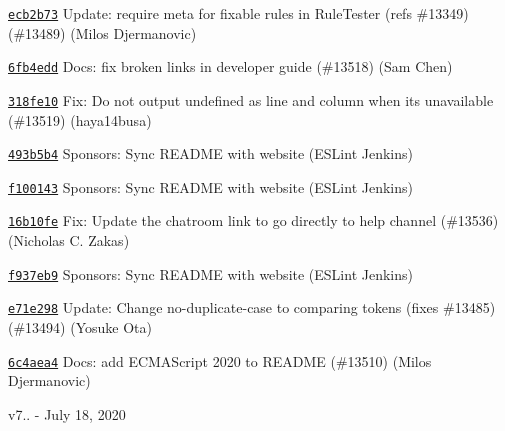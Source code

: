 \begin{DoxyItemize}
\item \href{https://github.com/eslint/eslint/commit/ecb2b7343a0d14fb57d297a16be6c1b176fb3dbf}{\texttt{ {\ttfamily ecb2b73}}} Update\+: require {\ttfamily meta} for fixable rules in Rule\+Tester (refs \#13349) (\#13489) (Milos Djermanovic)
\item \href{https://github.com/eslint/eslint/commit/6fb4edde3b7a7ae2faf8ac956a7342fbf80865fc}{\texttt{ {\ttfamily 6fb4edd}}} Docs\+: fix broken links in developer guide (\#13518) (Sam Chen)
\item \href{https://github.com/eslint/eslint/commit/318fe103dbf2548eee293ff456ef0b829dbe3db3}{\texttt{ {\ttfamily 318fe10}}} Fix\+: Do not output {\ttfamily undefined} as line and column when it\textquotesingle{}s unavailable (\#13519) (haya14busa)
\item \href{https://github.com/eslint/eslint/commit/493b5b40cae7a076fdeb19740f8c88fb4ae9c1fb}{\texttt{ {\ttfamily 493b5b4}}} Sponsors\+: Sync README with website (ESLint Jenkins)
\item \href{https://github.com/eslint/eslint/commit/f100143fa5f529aacb2b50e650a00d2697ca4c54}{\texttt{ {\ttfamily f100143}}} Sponsors\+: Sync README with website (ESLint Jenkins)
\item \href{https://github.com/eslint/eslint/commit/16b10fe8ba3c78939d5ada4a25caf2f0c9e6a058}{\texttt{ {\ttfamily 16b10fe}}} Fix\+: Update the chatroom link to go directly to help channel (\#13536) (Nicholas C. Zakas)
\item \href{https://github.com/eslint/eslint/commit/f937eb95407f60d3772bcb956e227aaf99e48777}{\texttt{ {\ttfamily f937eb9}}} Sponsors\+: Sync README with website (ESLint Jenkins)
\item \href{https://github.com/eslint/eslint/commit/e71e2980cd2e319afc70d8c859c7ffd59cf4157b}{\texttt{ {\ttfamily e71e298}}} Update\+: Change no-\/duplicate-\/case to comparing tokens (fixes \#13485) (\#13494) (Yosuke Ota)
\item \href{https://github.com/eslint/eslint/commit/6c4aea44fd78e1eecea5fe3c37e1921e3b1e98a6}{\texttt{ {\ttfamily 6c4aea4}}} Docs\+: add ECMAScript 2020 to README (\#13510) (Milos Djermanovic)
\end{DoxyItemize}

v7.. -\/ July 18, 2020


